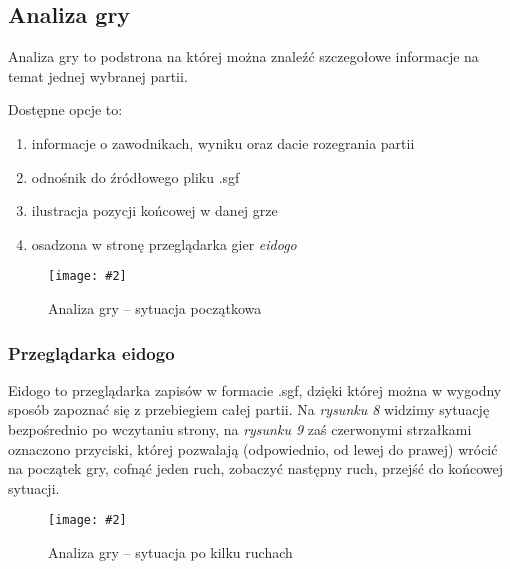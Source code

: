 \documentclass[10pt,leqno]{article}
\newcommand{\myimage}[3]{
  \begin{figure}[h!]
    \centering
      \texttt{[image: \#2]}
  \caption{#3}
  \end{figure}
}
\begin{document}
\subsection{Analiza gry}
Analiza gry to podstrona na której można znaleźć szczegołowe informacje na temat jednej wybranej partii.

Dostępne opcje to:
\begin{enumerate}
\item informacje o zawodnikach, wyniku oraz dacie rozegrania partii
\item odnośnik do źródłowego pliku .sgf
\item ilustracja pozycji końcowej w danej grze
\item osadzona w stronę przeglądarka gier \emph{eidogo}
\end{enumerate}

\myimage{0.47}{gameDetailsMain.png}{Analiza gry -- sytuacja początkowa}

\subsubsection{Przeglądarka eidogo}
  Eidogo to przeglądarka zapisów w formacie .sgf, dzięki której można w wygodny sposób zapoznać się z przebiegiem całej partii. 
  Na \emph{rysunku 8} widzimy sytuację bezpośrednio po wczytaniu strony, na \emph{rysunku 9} zaś czerwonymi strzałkami oznaczono przyciski,
  której pozwalają (odpowiednio, od lewej do prawej) wrócić na początek gry, cofnąć jeden ruch, zobaczyć następny ruch,
  przejść do końcowej sytuacji.
   
\myimage{0.47}{gameDetails.png}{Analiza gry -- sytuacja po kilku ruchach}

\end{document}
